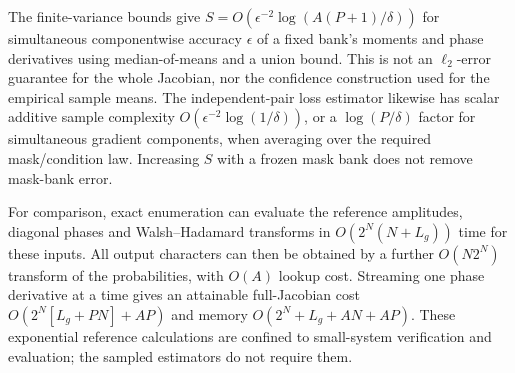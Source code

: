 The finite-variance bounds give $S=O(\epsilon^{-2}\log(A(P+1)/\delta))$ for simultaneous componentwise accuracy $\epsilon$ of a fixed bank's moments and phase derivatives using median-of-means and a union bound. This is not an $\ell_2$-error guarantee for the whole Jacobian, nor the confidence construction used for the empirical sample means. The independent-pair loss estimator likewise has scalar additive sample complexity $O(\epsilon^{-2}\log(1/\delta))$, or a $\log(P/\delta)$ factor for simultaneous gradient components, when averaging over the required mask/condition law. Increasing $S$ with a frozen mask bank does not remove mask-bank error.

For comparison, exact enumeration can evaluate the reference amplitudes, diagonal phases and Walsh--Hadamard transforms in $O(2^N(N+L_g))$ time for these inputs. All output characters can then be obtained by a further $O(N2^N)$ transform of the probabilities, with $O(A)$ lookup cost. Streaming one phase derivative at a time gives an attainable full-Jacobian cost $O(2^N[L_g+PN]+AP)$ and memory $O(2^N+L_g+AN+AP)$. These exponential reference calculations are confined to small-system verification and evaluation; the sampled estimators do not require them.
